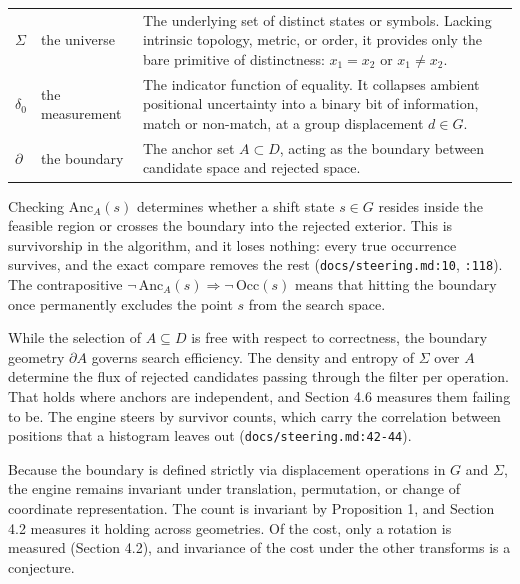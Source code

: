 \begin{center}
  \begin{tabular}{@{}p{2.2em}p{7.5em}p{}@{}}
    \toprule
    \(\Sigma\)   & the universe    &
      The underlying set of distinct states or symbols. Lacking intrinsic topology, metric, or
      order, it provides only the bare primitive of distinctness: \(x_1 = x_2\) or \(x_1 \neq x_2\). \\
    \addlinespace[0.7em]
    \(\delta_0\) & the measurement &
      The indicator function of equality. It collapses ambient positional uncertainty into a
      binary bit of information, match or non-match, at a group displacement \(d \in G\). \\
    \addlinespace[0.7em]
    \(\partial\) & the boundary    &
      The anchor set \(A \subset D\), acting as the boundary between candidate space and rejected
      space. \\
    \bottomrule
  \end{tabular}
\end{center}

Checking \(\mathrm{Anc}_A(s)\) determines whether a shift state \(s \in G\) resides inside the feasible
region or crosses the boundary into the rejected exterior. This is survivorship in the algorithm,
and it loses nothing: every true occurrence survives, and the exact compare removes the rest
(\texttt{docs/\allowbreak{}steering.md:10}, \texttt{:118}). The contrapositive \(\neg\,\mathrm{Anc}_A(s) \Longrightarrow \neg\,\mathrm{Occ}(s)\) means
that hitting the boundary once permanently excludes the point \(s\) from the search space.

While the selection of \(A \subseteq D\) is free with respect to correctness, the boundary geometry
\(\partial A\) governs search efficiency. The density and entropy of \(\Sigma\) over \(A\) determine the
flux of rejected candidates passing through the filter per operation. That holds where anchors are
independent, and Section 4.6 measures them failing to be. The engine steers by survivor counts,
which carry the correlation between positions that a histogram leaves out
(\texttt{docs/\allowbreak{}steering.md:42-\allowbreak{}44}).

Because the boundary is defined strictly via displacement operations in \(G\) and \(\Sigma\), the
engine remains invariant under translation, permutation, or change of coordinate representation.
The count is invariant by Proposition 1, and Section 4.2 measures it holding across geometries. Of
the cost, only a rotation is measured (Section 4.2), and invariance of the cost under the other
transforms is a conjecture.

